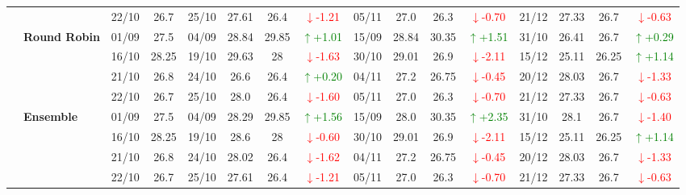 {\begin{longtable}{llcc|cccc|cccc|cccc}
&
& 22/10 & 26.7 & 25/10 & 27.61 & 26.4 & \textcolor{red}{\(\downarrow\)-1.21} & 05/11 & 27.0 & 26.3 & \textcolor{red}{\(\downarrow\)-0.70} & 21/12 & 27.33 & 26.7 & \textcolor{red}{\(\downarrow\)-0.63} \\
\cmidrule(lr){2-16}


& \textbf{Round Robin}
& 01/09 & 27.5 & 04/09 & 28.84 & 29.85 & \textcolor{green}{\(\uparrow\)+1.01} & 15/09 & 28.84 & 30.35 & \textcolor{green}{\(\uparrow\)+1.51} & 31/10 & 26.41 & 26.7 & \textcolor{green}{\(\uparrow\)+0.29} \\

& 
& 16/10 & 28.25 & 19/10 & 29.63 & 28 & \textcolor{red}{\(\downarrow\)-1.63} & 30/10 & 29.01 & 26.9 & \textcolor{red}{\(\downarrow\)-2.11} & 15/12 & 25.11 & 26.25 & \textcolor{green}{\(\uparrow\)+1.14} \\

& 
& 21/10 & 26.8 & 24/10 & 26.6 & 26.4 & \textcolor{green}{\(\uparrow\)+0.20} & 04/11 & 27.2 & 26.75 & \textcolor{red}{\(\downarrow\)-0.45} & 20/12 & 28.03 & 26.7 & \textcolor{red}{\(\downarrow\)-1.33} \\

&
& 22/10 & 26.7 & 25/10 & 28.0 & 26.4 & \textcolor{red}{\(\downarrow\)-1.60} & 05/11 & 27.0 & 26.3 & \textcolor{red}{\(\downarrow\)-0.70} & 21/12 & 27.33 & 26.7 & \textcolor{red}{\(\downarrow\)-0.63} \\
\cmidrule(lr){2-16}


& \textbf{Ensemble}
& 01/09 & 27.5 & 04/09 & 28.29 & 29.85& \textcolor{green}{\(\uparrow\)+1.56} & 15/09 & 28.0 & 30.35 & \textcolor{green}{\(\uparrow\)+2.35} & 31/10 & 28.1 & 26.7 & \textcolor{red}{\(\downarrow\)-1.40} \\

& 
& 16/10 & 28.25 & 19/10 & 28.6 & 28 & \textcolor{red}{\(\downarrow\)-0.60} & 30/10 & 29.01 & 26.9 & \textcolor{red}{\(\downarrow\)-2.11} & 15/12 & 25.11 & 26.25 & \textcolor{green}{\(\uparrow\)+1.14} \\

& 
& 21/10 & 26.8 & 24/10 & 28.02 & 26.4 & \textcolor{red}{\(\downarrow\)-1.62} & 04/11 & 27.2 & 26.75 & \textcolor{red}{\(\downarrow\)-0.45} & 20/12 & 28.03 & 26.7 & \textcolor{red}{\(\downarrow\)-1.33} \\

&
& 22/10 & 26.7 & 25/10 & 27.61 & 26.4 & \textcolor{red}{\(\downarrow\)-1.21} & 05/11 & 27.0 & 26.3 & \textcolor{red}{\(\downarrow\)-0.70} & 21/12 & 27.33 & 26.7 & \textcolor{red}{\(\downarrow\)-0.63} \\
\midrule




\end{longtable}}
